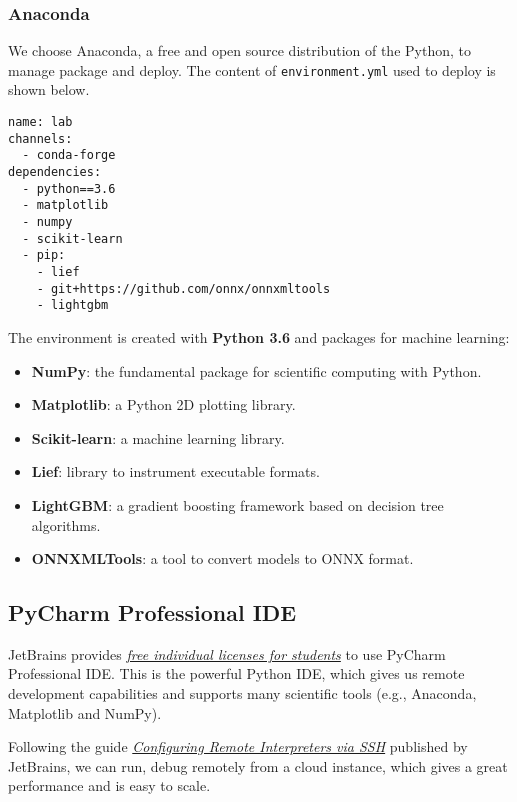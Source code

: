 \subsubsection{Anaconda}

We choose Anaconda, a free and open source distribution of the Python, to manage package and deploy. The content of \verb|environment.yml| used to deploy is shown below. 

\begin{lstlisting}
name: lab
channels:
  - conda-forge
dependencies:
  - python==3.6
  - matplotlib
  - numpy
  - scikit-learn
  - pip:
    - lief
    - git+https://github.com/onnx/onnxmltools
    - lightgbm
\end{lstlisting}

The environment is created with \textbf{Python 3.6} and packages for machine learning:

\begin{itemize}
\item \textbf{NumPy}: the fundamental package for scientific computing with Python.
\item \textbf{Matplotlib}: a Python 2D plotting library.
\item \textbf{Scikit-learn}: a machine learning library.
\item \textbf{Lief}: library to instrument executable formats.
\item \textbf{LightGBM}: a gradient boosting framework based on decision tree algorithms.
\item \textbf{ONNXMLTools}: a tool to convert models to ONNX format.
\end{itemize}

\subsection{PyCharm Professional IDE}

JetBrains provides \textit{\href{https://www.jetbrains.com/student/}{free individual licenses for students}} to use PyCharm Professional IDE. This is the powerful Python IDE, which gives us remote development capabilities and supports many scientific tools (e.g., Anaconda, Matplotlib and NumPy).

Following the guide \textit{\href{https://www.jetbrains.com/help/pycharm/configuring-remote-interpreters-via-ssh.html}{Configuring Remote Interpreters via SSH}} published by JetBrains, we can run, debug remotely from a cloud instance, which gives a great performance and is easy to scale.
